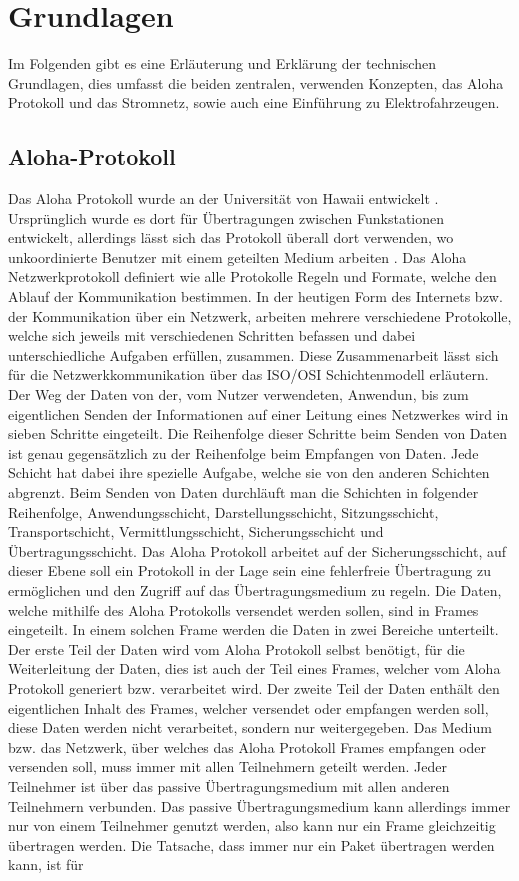 \chapter{Grundlagen}
\label{chap:grundlagen}
Im Folgenden gibt es eine Erläuterung und Erklärung der technischen Grundlagen, dies umfasst die beiden zentralen, verwenden Konzepten, das Aloha Protokoll und das Stromnetz, sowie auch eine Einführung zu Elektrofahrzeugen.

\section{Aloha-Protokoll}
\label{capBack:Aloha}
Das Aloha Protokoll wurde an der Universität von Hawaii entwickelt \cite{aloha_firstsource}. Ursprünglich wurde es dort für Übertragungen zwischen Funkstationen entwickelt, allerdings lässt sich das Protokoll überall dort verwenden, wo unkoordinierte Benutzer mit einem geteilten Medium arbeiten \cite{Back_AlohaPure}. Das Aloha Netzwerkprotokoll definiert wie alle Protokolle Regeln und Formate, welche den Ablauf der Kommunikation bestimmen. In der heutigen Form des Internets bzw. der Kommunikation über ein Netzwerk, arbeiten mehrere verschiedene Protokolle, welche sich jeweils mit verschiedenen Schritten befassen und dabei unterschiedliche Aufgaben erfüllen, zusammen. Diese Zusammenarbeit lässt sich für die Netzwerkkommunikation über das ISO/OSI Schichtenmodell erläutern. Der Weg der Daten von der, vom Nutzer verwendeten, Anwendun, bis zum eigentlichen Senden der Informationen auf einer Leitung eines Netzwerkes wird in sieben Schritte eingeteilt. Die Reihenfolge dieser Schritte beim Senden von Daten ist genau gegensätzlich zu der Reihenfolge beim Empfangen von Daten. Jede Schicht hat dabei ihre spezielle Aufgabe, welche sie von den anderen Schichten abgrenzt. Beim Senden von Daten durchläuft man die Schichten in folgender Reihenfolge, Anwendungsschicht, Darstellungsschicht, Sitzungsschicht, Transportschicht, Vermittlungsschicht, Sicherungsschicht und Übertragungsschicht. Das Aloha Protokoll arbeitet auf der Sicherungsschicht, auf dieser Ebene soll ein Protokoll in der Lage sein eine fehlerfreie Übertragung zu ermöglichen und den Zugriff auf das Übertragungsmedium zu regeln. Die Daten, welche mithilfe des Aloha Protokolls versendet werden sollen, sind in Frames eingeteilt. In einem solchen Frame werden die Daten in zwei Bereiche unterteilt. Der erste Teil der Daten wird vom Aloha Protokoll selbst benötigt, für die Weiterleitung der Daten, dies ist auch der Teil eines Frames, welcher vom Aloha Protokoll generiert bzw. verarbeitet wird. Der zweite Teil der Daten enthält den eigentlichen Inhalt des Frames, welcher versendet oder empfangen werden soll, diese Daten werden nicht verarbeitet, sondern nur weitergegeben. Das Medium bzw. das Netzwerk, über welches das Aloha Protokoll Frames empfangen oder versenden soll, muss immer mit allen Teilnehmern geteilt werden. Jeder Teilnehmer ist über das passive Übertragungsmedium mit allen anderen Teilnehmern verbunden. Das passive Übertragungsmedium kann allerdings immer nur von einem Teilnehmer genutzt werden, also kann nur ein Frame gleichzeitig übertragen werden. Die Tatsache, dass immer nur ein Paket übertragen werden kann, ist für 